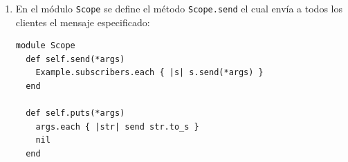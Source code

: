 \begin{enumerate}
La petición es recibida en la correspondiente
ruta
\begin{verbatim}
  post '/run' do
    begin
      result = nil
      stdout = capture_stdout do
        result = eval("_ = (#{params[:code]})", settings.scope, "(irb)", settings.line)
        settings.line += 1
      end
      stdout << "=> " << result.inspect
    rescue Exception => e
      stdout = [e.to_s, *e.backtrace.map { |l| "\t#{l}" }].join("\n")
    end
    source = escape stdout
    Scope.send source
    ''
  end
\end{verbatim}
\begin{enumerate}
\item  El método \verb|eval| tiene estos argumentos:
\begin{verbatim}
eval(string [, binding [, filename [,lineno]]])
\end{verbatim}
  \begin{enumerate}
  \item 
  Evaluates the Ruby expression(s) in string.  
  \item 
  \verb|binding| is 
  a \Binding{} object: the evaluation is performed in its
  context. 
  \item 
  \verb|filename| and \verb|lineno|  are 
  used when reporting syntax errors.
  \end{enumerate}
\item 
El método \verb|capture_stdout| nos permite capturar la salida por \verb|stdout| de 
una evaluación:
\begin{verbatim}
[~/Chapter6MethodsProcsLambdasAndClosures]$ pry
[1] pry(main)> require 'capture_stdout'
=> true
[2] pry(main)> string = 'yeah'
=> "yeah"
[3] pry(main)> output = capture_stdout { print(string) }  
=> "yeah"
\end{verbatim}
\end{enumerate}
\item 
En el módulo \verb|Scope| se define el método \verb|Scope.send| el cual envía a todos los
clientes el mensaje especificado:
\begin{verbatim}
module Scope
  def self.send(*args)
    Example.subscribers.each { |s| s.send(*args) }
  end

  def self.puts(*args)
    args.each { |str| send str.to_s }
    nil
  end


\end{verbatim}
\end{enumerate}
